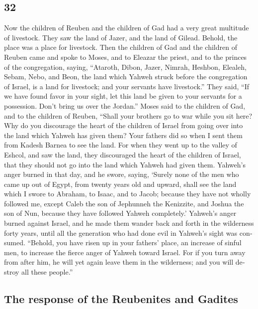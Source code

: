 \begin{paracol}{2}
\begin{otherlanguage}{english}
\hypertarget{section-63}{%
\section{32}\label{section-63}}

 Now the children of Reuben and the children of Gad had a
very great multitude of livestock. They saw the land of Jazer, and the
land of Gilead. Behold, the place was a place for livestock.
 Then the children of Gad and the children of Reuben came
and spoke to Moses, and to Eleazar the priest, and to the princes of the
congregation, saying,  ``Ataroth, Dibon, Jazer, Nimrah,
Heshbon, Elealeh, Sebam, Nebo, and Beon,  the land which
Yahweh struck before the congregation of Israel, is a land for
livestock; and your servants have livestock.''  They said,
``If we have found favor in your sight, let this land be given to your
servants for a possession. Don't bring us over the Jordan.''
 Moses said to the children of Gad, and to the children of
Reuben, ``Shall your brothers go to war while you sit here?
 Why do you discourage the heart of the children of Israel
from going over into the land which Yahweh has given them?
 Your fathers did so when I sent them from Kadesh Barnea
to see the land.  For when they went up to the valley of
Eshcol, and saw the land, they discouraged the heart of the children of
Israel, that they should not go into the land which Yahweh had given
them.  Yahweh's anger burned in that day, and he swore,
saying,  `Surely none of the men who came up out of
Egypt, from twenty years old and upward, shall see the land which I
swore to Abraham, to Isaac, and to Jacob; because they have not wholly
followed me,  except Caleb the son of Jephunneh the
Kenizzite, and Joshua the son of Nun, because they have followed Yahweh
completely.'  Yahweh's anger burned against Israel, and
he made them wander back and forth in the wilderness forty years, until
all the generation who had done evil in Yahweh's sight was consumed.
 ``Behold, you have risen up in your fathers' place, an
increase of sinful men, to increase the fierce anger of Yahweh toward
Israel.  For if you turn away from after him, he will yet
again leave them in the wilderness; and you will destroy all these
people.''

\hypertarget{the-response-of-the-reubenites-and-gadites}{%
\subsection{The response of the Reubenites and
Gadites}\label{the-response-of-the-reubenites-and-gadites}}


\end{otherlanguage}
\end{paracol}
